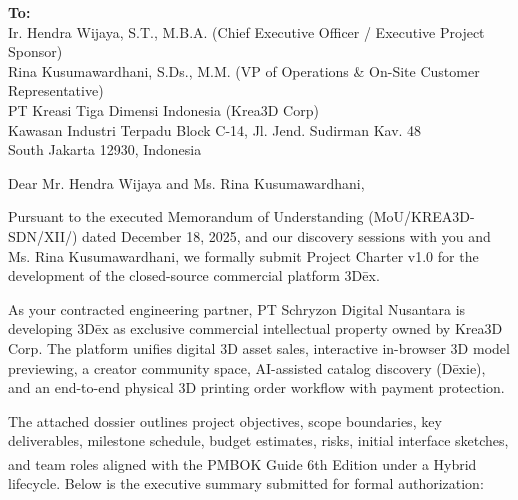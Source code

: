 \documentclass[11pt,a4paper]{article}
\begin{document}
\vspace{12pt}

\noindent
\textbf{To:} \\
Ir. Hendra Wijaya, S.T., M.B.A. (Chief Executive Officer / Executive Project Sponsor) \\
Rina Kusumawardhani, S.Ds., M.M. (VP of Operations \& On-Site Customer Representative) \\
PT Kreasi Tiga Dimensi Indonesia (Krea3D Corp) \\
Kawasan Industri Terpadu Block C-14, Jl. Jend. Sudirman Kav. 48 \\
South Jakarta 12930, Indonesia

\vspace{12pt}

\noindent
Dear Mr. Hendra Wijaya and Ms. Rina Kusumawardhani,

Pursuant to the executed Memorandum of Understanding (MoU/\allowbreak KREA3D-\allowbreak SDN/\allowbreak XII/) dated December 18, 2025, and our discovery sessions with you and Ms. Rina Kusumawardhani, we formally submit Project Charter v1.0 for the development of the closed-source commercial platform 3D\={e}x.

As your contracted engineering partner, PT Schryzon Digital Nusantara is developing 3D\={e}x as exclusive commercial intellectual property owned by Krea3D Corp. The platform unifies digital 3D asset sales, interactive in-browser 3D model previewing, a creator community space, AI-assisted catalog discovery (D\={e}xie), and an end-to-end physical 3D printing order workflow with payment protection.

The attached dossier outlines project objectives, scope boundaries, key deliverables, milestone schedule, budget estimates, risks, initial interface sketches, and team roles aligned with the PMBOK\textsuperscript{\textregistered} Guide 6th Edition under a Hybrid lifecycle. Below is the executive summary submitted for formal authorization:

\clearpage

\hypersetup{linkcolor=black,urlcolor=black,citecolor=black}
\end{document}
